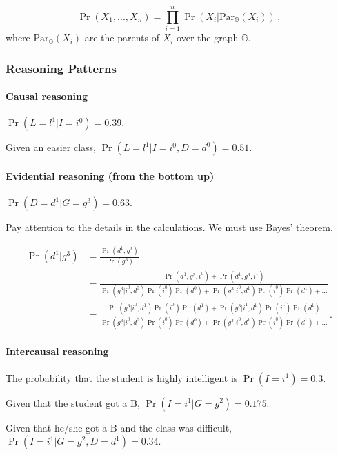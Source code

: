\documentclass[12pt]{article}
\begin{document}
\begin{equation}
  \Pr(X_1, ..., X_n) = \prod_{i=1}^n \Pr(X_i | \text{Par}_\mathbb{G}( X_i ) ) \, ,
\end{equation}
where $\text{Par}_\mathbb{G}( X_i )$ are the parents of $X_i$ over the graph $\mathbb{G}$.


\subsubsection{Reasoning Patterns}
\paragraph{Causal reasoning}
$\Pr(L = l^1 | I = i^0) = 0.39$.

Given an easier class, $\Pr(L = l^1 | I = i^0, D = d^0) = 0.51$.

\paragraph{Evidential reasoning (from the bottom up)}
$\Pr(D = d^1 | G = g^3) = 0.63$.

Pay attention to the details in the calculations. We must use Bayes' theorem.

\begin{align*}
\Pr(d^1 | g^3) & = \frac{\Pr(d^1, g^3)}
                      {\Pr(g^3)} \\
               & = \frac{\Pr(d^1, g^3, i^0) + \Pr(d^1, g^3, i^1)}
                        {\Pr(g^3 | i^0, d^0) \Pr(i^0) \Pr(d^0) + \Pr(g^3 | i^0, d^1) \Pr(i^0) \Pr(d^1) + \ldots} \\
               & = \frac{\Pr(g^3 | i^0, d^1) \Pr(i^0) \Pr(d^1) + \Pr(g^3 | i^1, d^1) \Pr(i^1) \Pr(d^1)}
                        {\Pr(g^3 | i^0, d^0) \Pr(i^0) \Pr(d^0) + \Pr(g^3 | i^0, d^1) \Pr(i^0) \Pr(d^1) + \ldots} \, .
\end{align*}



\paragraph{Intercausal reasoning}

The probability that the student is highly intelligent is $\Pr(I = i^1) = 0.3$.

Given that the student got a B, $\Pr(I = i^1 | G = g^2) = 0.175$.

Given that he/she got a B and the class was difficult, $\Pr(I = i^1 | G = g^2, D = d^1) = 0.34$.
\end{document}

